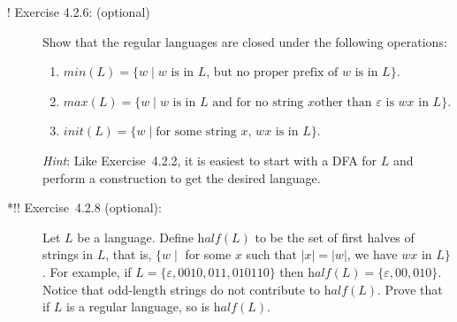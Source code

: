 \documentclass[11pt]{article}
\newcommand{\emptystr}{\varepsilon}
\newcommand{\tb}[1]{\textbf{#1}}
\theoremstyle{plain}
\theoremstyle{definition}
\begin{document}
\begin{description}

\item[! Exercise 4.2.6: (optional)]
  Show that the regular languages are closed under the following
  operations:
  \begin{enumerate}[label={\alph*)}]
    \item $\textit{min}(L) = \{w\mid \mbox{$w$ is in $L$, but no proper
      prefix of $w$ is in $L$} \}$.
    \item $\textit{max}(L) = \{w\mid \mbox{$w$ is in $L$ and for no string $x$
      other than $\emptystr$ is $wx$ in $L$} \}$.
    \item $\textit{init}(L) = \{ w\mid \mbox{for some string $x$, $wx$ is in $L$}
      \}$.
  \end{enumerate}
  \emph{Hint}: Like Exercise~4.2.2, it is easiest to start with a DFA
  for $L$ and perform a construction to get the desired language.

\item[*!! Exercise~4.2.8 (optional):] Let $L$ be a language.  Define
  $\textit{half}(L)$ to be the set of first halves of strings in $L$,
  that is, $\{ w \mid$ for some $x$ such that $|x|=|w|$, we have $wx$
  in $L\}$.  For example, if $L = \{\emptystr,0010,011,010110\}$ then
  $\textit{half}(L) = \{\emptystr,00,010\}$.  Notice that odd-length
  strings do not contribute to $\textit{half}(L)$.  Prove that if $L$
  is a regular language, so is $\textit{half}(L)$.


\end{description}
\end{document}
